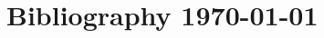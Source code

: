 \documentclass[12pt,letterpaper]{article}
\newcommand{\mytitle}{Bibliography \today}
\begin{document}
\section{\mytitle}
\nocite{*}


%
\end{document}
